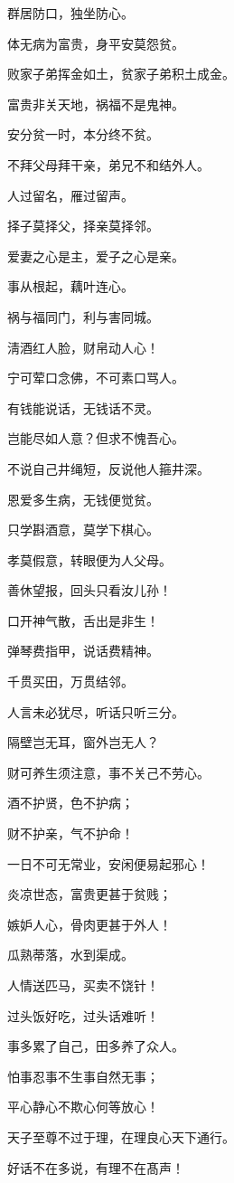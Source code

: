 \documentclass[12pt,oneside]{book}
\begin{document}
群居防口，独坐防心。

体无病为富贵，身平安莫怨贫。

败家子弟挥金如土，贫家子弟积土成金。

富贵非关天地，祸福不是鬼神。

安分贫一时，本分终不贫。

不拜父母拜干亲，弟兄不和结外人。

人过留名，雁过留声。

择子莫择父，择亲莫择邻。

爱妻之心是主，爱子之心是亲。

事从根起，藕叶连心。

祸与福同门，利与害同城。

淸酒红人脸，财帛动人心！

宁可荤口念佛，不可素口骂人。

有钱能说话，无钱话不灵。

岂能尽如人意？但求不愧吾心。

不说自己井绳短，反说他人箍井深。

恩爱多生病，无钱便觉贫。

只学斟酒意，莫学下棋心。

孝莫假意，转眼便为人父母。

善休望报，回头只看汝儿孙！

口开神气散，舌出是非生！

弹琴费指甲，说话费精神。

千贯买田，万贯结邻。

人言未必犹尽，听话只听三分。

隔壁岂无耳，窗外岂无人？

财可养生须注意，事不关己不劳心。

酒不护贤，色不护病；

财不护亲，气不护命！

一日不可无常业，安闲便易起邪心！

炎凉世态，富贵更甚于贫贱；

嫉妒人心，骨肉更甚于外人！

瓜熟蒂落，水到渠成。

人情送匹马，买卖不饶针！

过头饭好吃，过头话难听！

事多累了自己，田多养了众人。

怕事忍事不生事自然无事；

平心静心不欺心何等放心！

天子至尊不过于理，在理良心天下通行。

好话不在多说，有理不在髙声！
\end{document}
